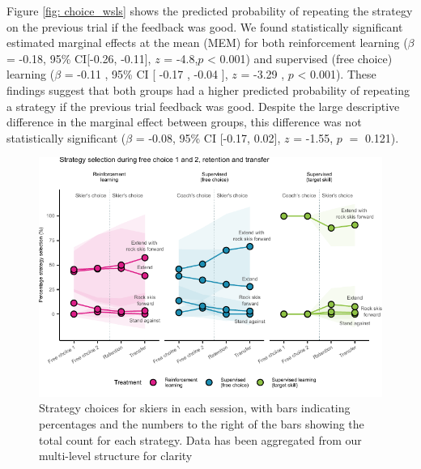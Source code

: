 \documentclass[pdflatex,sn-mathphys-num]{sn-jnl}%
\theoremstyle{thmstyleone}%
\theoremstyle{thmstyletwo}%
\theoremstyle{thmstylethree}%
\begin{document}
Figure \ref{fig: choice_wsls} shows the predicted probability of repeating the strategy on the previous trial if the feedback was good. We found statistically significant estimated marginal effects at the mean (MEM) for both reinforcement learning  ($\beta$ = -0.18, 95\% CI[-0.26, -0.11], $z$ = -4.8,$p$ < 0.001) and supervised (free choice) learning ($\beta$ = -0.11 , 95\% CI [ -0.17 ,  -0.04 ], $z$ = -3.29 , $p$  <  0.001). These findings suggest that both groups had a higher predicted probability of repeating a strategy if the previous trial feedback was good. Despite the large descriptive difference in the marginal effect between groups, this difference was not statistically  significant ($\beta$ = -0.08, 95\% CI [-0.17, 0.02], $z$ = -1.55, $p$ $=$ 0.121).












\begin{figure}[H]
\centering
\includegraphics{figures/figure_choice_descriptivecount_4.pdf}
\caption{Strategy choices for skiers in each session, with bars indicating percentages and the numbers to the right of the bars showing the total count for
each strategy. Data has been aggregated from our multi-level structure for clarity}\label{fig: choice_descriptives}
\end{figure}
\end{document}
